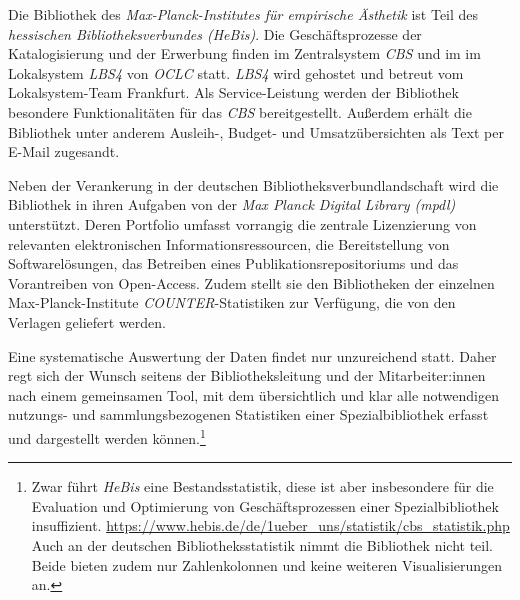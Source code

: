 Die Bibliothek des \textit{Max-Planck-Institutes für empirische Ästhetik}
ist Teil des \textit{hessischen Bibliotheksverbundes (HeBis)}. Die Geschäftsprozesse
der Katalogisierung und der Erwerbung finden im Zentralsystem \textit{CBS} und im im Lokalsystem \textit{LBS4} von
\textit{OCLC} statt. \textit{LBS4} wird gehostet und betreut vom Lokalsystem-Team Frankfurt. Als Service-Leistung werden der Bibliothek besondere Funktionalitäten
für das \textit{CBS} bereitgestellt. Außerdem erhält die Bibliothek unter anderem Ausleih-, Budget- und
Umsatzübersichten als Text per E-Mail zugesandt.


Neben der Verankerung in der deutschen Bibliotheksverbundlandschaft
wird die Bibliothek in ihren Aufgaben von der
\textit{Max Planck Digital Library (mpdl)}
unterstützt. Deren Portfolio umfasst vorrangig die zentrale Lizenzierung
von relevanten elektronischen Informationsressourcen, die Bereitstellung
von Softwarelösungen, das Betreiben eines Publikationsrepositoriums und
das Vorantreiben von Open-Access. Zudem stellt sie den Bibliotheken der einzelnen Max-Planck-Institute
\textit{COUNTER}-Statistiken zur Verfügung, die von den Verlagen geliefert werden.



Eine systematische Auswertung der Daten findet nur unzureichend statt.
Daher regt sich der Wunsch seitens der Bibliotheksleitung und der Mitarbeiter:innen nach einem gemeinsamen Tool,
mit dem übersichtlich und klar alle notwendigen nutzungs- und sammlungsbezogenen Statistiken einer
Spezialbibliothek erfasst und dargestellt werden können.\footnote{Zwar führt \textit{HeBis} eine Bestandsstatistik, diese ist aber insbesondere für die
Evaluation und Optimierung von Geschäftsprozessen einer Spezialbibliothek
insuffizient. \url{https://www.hebis.de/de/1ueber_uns/statistik/cbs_statistik.php} 
Auch an der deutschen Bibliotheksstatistik nimmt die Bibliothek nicht teil. Beide bieten zudem nur Zahlenkolonnen und keine weiteren Visualisierungen an.}
